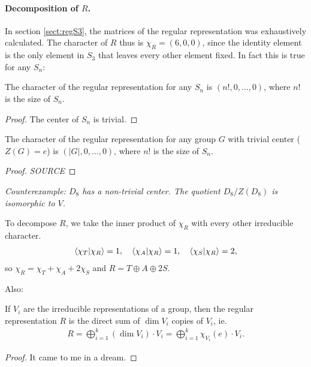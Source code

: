 \paragraph{Decomposition of $R$.} In section \ref{sect:regS3}, the matrices of the regular representation was exhaustively calculated. The character of $R$ thus is $\chi_R = (6,0,0)$, since the identity element is the only element in $S_3$ that leaves every other element fixed. In fact this is true for any $S_n$:
\begin{corollary}\label{thm:charregSn}
	 The character of the regular representation for any $S_n$ is $(n!, 0, \dots, 0)$, where $n!$ is the size of $S_n$.
\end{corollary}
\begin{proof}
	The center of $S_n$ is trivial.
\end{proof}
\begin{corollary}
	The character of the regular representation for any group $G$ with trivial center ($Z(G)={e}$) is $(|G|, 0, \dots, 0)$, where $n!$ is the size of $S_n$.
\end{corollary}
\begin{proof}
	\textit{SOURCE}
\end{proof}

\textit{Counterexample: $D_8$ has a non-trivial center. The quotient $D_8/Z(D_8)$ is isomorphic to $V$.} 

To decompose $R$, we take the inner product of $\chi_R$ with every other irreducible character.
\begin{align}
	\bra{\chi_T}\ket{\chi_R} = 1, \quad
	\bra{\chi_A}\ket{\chi_R} = 1, \quad
	\bra{\chi_S}\ket{\chi_R} = 2, 
\end{align}
so $\chi_R = \chi_T + \chi_A + 2\chi_S$ and $R = T \oplus A \oplus 2S$.

Also:
\begin{theorem}
	If $V_i$ are the irreducible representations of a group, then the regular representation $R$ is the direct sum of $\dim V_i$ copies of $V_i$, ie. 
	\begin{align}
		R = \bigoplus_{i=1}^{k} (\dim V_i) \cdot V_i = \bigoplus_{i=1}^{k} \chi_{V_i}(e) \cdot V_i .
	\end{align}
\end{theorem}
\begin{proof}
	It came to me in a dream. %
\end{proof}

